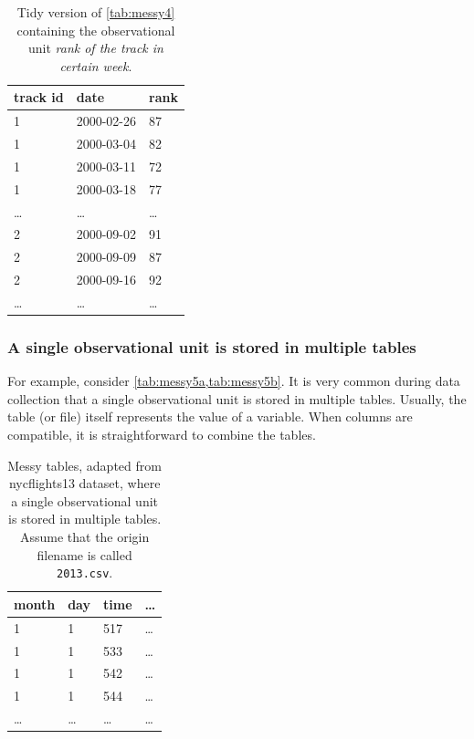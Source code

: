 \begin{table}
  \centering
  \begin{tabular}{lll}
    \toprule
    \textbf{track id} & \textbf{date} & \textbf{rank} \\
    \midrule
    1 & 2000-02-26 & 87 \\
    1 & 2000-03-04 & 82 \\
    1 & 2000-03-11 & 72 \\
    1 & 2000-03-18 & 77 \\
    \dots & \dots & \dots \\
    2 & 2000-09-02 & 91 \\
    2 & 2000-09-09 & 87 \\
    2 & 2000-09-16 & 92 \\
    \dots & \dots & \dots \\
    \bottomrule
  \end{tabular}
  \caption{
    Tidy version of \cref{tab:messy4} containing the observational unit \emph{rank of the
    track in certain week}.
  }
  \label{tab:tidy4b}
\end{table}

\subsubsection{A single observational unit is stored in multiple tables}  For example, consider
\cref{tab:messy5a,tab:messy5b}.  It is very common during data
collection that a single observational unit is stored in multiple tables.  Usually, the
table (or file) itself represents the value of a variable.  When columns are compatible,
it is straightforward to combine the tables.

\begin{table}
  \centering
  \begin{tabular}{llll}
    \toprule
    \textbf{month} & \textbf{day} & \textbf{time} & \textbf{\dots} \\
    \midrule
    1 & 1 & 517 & \dots \\
    1 & 1 & 533 & \dots \\
    1 & 1 & 542 & \dots \\
    1 & 1 & 544 & \dots \\
    \dots & \dots & \dots & \dots \\
    \bottomrule
  \end{tabular}
  \caption{
    Messy tables, adapted from nycflights13 dataset, where a single observational unit is
    stored in multiple tables.  Assume that the origin filename is called
    \texttt{2013.csv}.
  }
  \label{tab:messy5a}
\end{table}

